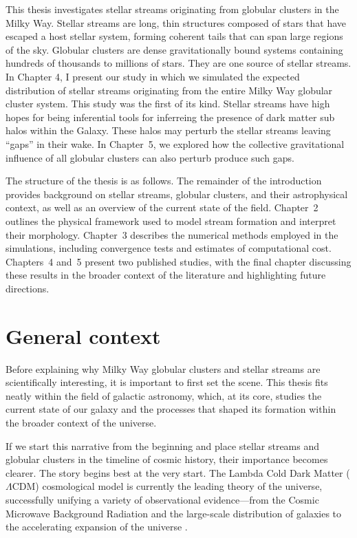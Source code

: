 This thesis investigates stellar streams originating from globular clusters in the Milky Way. Stellar streams are long, thin structures composed of stars that have escaped a host stellar system, forming coherent tails that can span large regions of the sky. Globular clusters are dense gravitationally bound systems containing hundreds of thousands to millions of stars. They are one source of stellar streams. In Chapter 4, I present our study in which we simulated the expected distribution of stellar streams originating from the entire Milky Way globular cluster system. This study was the first of its kind. Stellar streams have high hopes for being inferential tools for inferreing the presence of dark matter sub halos within the Galaxy. These halos may perturb the stellar streams leaving ``gaps'' in their wake. In Chapter~5, we explored how the collective gravitational influence of all globular clusters can also perturb produce such gaps.

The structure of the thesis is as follows. The remainder of the introduction provides background on stellar streams, globular clusters, and their astrophysical context, as well as an overview of the current state of the field. Chapter~2 outlines the physical framework used to model stream formation and interpret their morphology. Chapter~3 describes the numerical methods employed in the simulations, including convergence tests and estimates of computational cost. Chapters~4 and~5 present two published studies, with the final chapter discussing these results in the broader context of the literature and highlighting future directions.

\section{General context}
    Before explaining why Milky Way globular clusters and stellar streams are scientifically interesting, it is important to first set the scene. This thesis fits neatly within the field of galactic astronomy, which, at its core, studies the current state of our galaxy and the processes that shaped its formation within the broader context of the universe.

    If we start this narrative from the beginning and place stellar streams and globular clusters in the timeline of cosmic history, their importance becomes clearer. The story begins best at the very start. The Lambda Cold Dark Matter ($\Lambda$CDM) cosmological model is currently the leading theory of the universe, successfully unifying a variety of observational evidence—from the Cosmic Microwave Background Radiation and the large-scale distribution of galaxies to the accelerating expansion of the universe \citep{2001LRR.....4....1C,2022NewAR..9501659P}.

